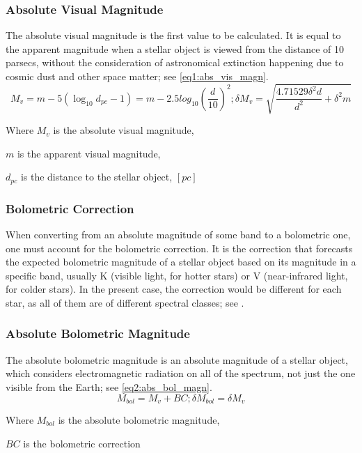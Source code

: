\documentclass[stu, 11pt, a4paper, floatsintext, noextraspace]{apa7}
\begin{document}
	\subsubsection{Absolute Visual Magnitude}
	The absolute visual magnitude is the first value to be calculated. It is equal to the apparent magnitude when a stellar object is viewed from the distance of 10 parsecs, without the consideration of astronomical extinction happening due to cosmic dust and other space matter; see \cref{eq1:abs_vis_magn}.
	\begin{equation}
		\label{eq1:abs_vis_magn}
		M_v=m-5\left(\log_{10}d_{pc} - 1\right)=m-2.5log_{10}\left(\frac{d}{10}\right)^2; \delta M_v=\sqrt{\frac{4.71529\delta^2d}{d^2}+\delta^2m}
	\end{equation}
	\begin{center}
		Where $M_v$ is the absolute visual magnitude,
		
 		$m$ is the apparent visual magnitude,
 
 		$d_{pc}$ is the distance to the stellar object, $[pc]$
	\end{center}
	\subsubsection{Bolometric Correction}
	When converting from an absolute magnitude of some band to a bolometric one, one must account for the bolometric correction. It is the correction that forecasts the expected bolometric magnitude of a stellar object based on its magnitude in a specific band, usually K (visible light, for hotter stars) or V (near-infrared light, for colder stars). In the present case, the correction would be different for each star, as all of them are of different spectral classes; see .
	\subsubsection{Absolute Bolometric Magnitude}
	The absolute bolometric magnitude is an absolute magnitude of a stellar object, which considers electromagnetic radiation on all of the spectrum, not just the one visible from the Earth; see \cref{eq2:abs_bol_magn}.
	\begin{equation}
		\label{eq2:abs_bol_magn}
		M_{bol}=M_v+BC; \delta M_{bol} = \delta M_v
	\end{equation}
	\begin{center}
		Where $M_{bol}$ is the absolute bolometric magnitude,
		
 		$BC$ is the bolometric correction
	\end{center}
\end{document}
